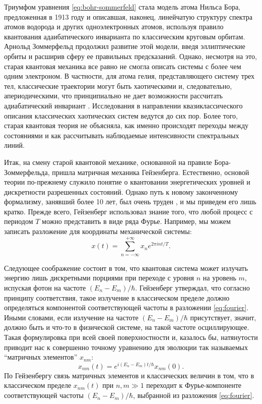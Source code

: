 \documentclass[14pt, a4paper]{extreport}
\numberwithin{equation}{section}
\begin{document}
Триумфом уравнения \eqref{eq:bohr-sommerfeld} стала модель атома Нильса Бора, предложенная в 1913 году и описавшая, наконец, линейчатую структуру спектра атомов водорода и других одноэлектронных атомов, используя правило квантования адаибатического инварианта по классическим круговым орбитам. Арнольд Зоммерфельд продолжил развитие этой модели, введя эллиптические орбиты и расширив сферу ее правильных предсказаний. Однако, несмотря на это, старая квантовая механика все равно не смогла описать системы с более чем одним электроном. В частности, для атома гелия, представляющего систему трех тел, классические траектории могут быть хаотическими и, следовательно, апериодическими, что принципиально не дает возможности рассчитать адиабатический инвариант \cite{wintgen1992semiclassical}. Исследования в направлении квазиклассического описания классических хаотических систем ведутся до сих пор. Более того, старая квантовая теория не объясняла, как именно происходят переходы между состояниями и как рассчитывать наблюдаемые интенсивности спектральных линий.

Итак, на смену старой квантовой механике, основанной на правиле Бора-Зоммерфельда, пришла матричная механика Гейзенберга. Естественно, основой теории по-прежнему служило понятие о квантовании энергетических уровней и дискретности разрешенных состояний. Однако путь к новому законченному формализму, занявший более 10 лет, был очень труден \cite{van2007sources}, и мы приведем его лишь кратко. Прежде всего, Гейзенберг использовал знание того, что любой процесс с периодом $T$ можно представить в виде ряда Фурье. Например, мы можем записать разложение для координаты механической системы:
\begin{equation}
	x(t) = \sum_{n=-\infty}^{+\infty} x_n e^{2\pi i n t/T}.\label{eq:fourier}
\end{equation}

Следующее соображение состоит в том, что квантовая система может излучать энергию лишь дискретными порциями при переходе с уровня $n$ на уровень $m$, испуская фотон на частоте $(E_n - E_m)/\hbar$. Гейзенберг утверждал, что согласно принципу соответствия, такое излучение в классическом пределе должно определяться компонентой соответствующей частоты в разложении \eqref{eq:fourier}. Иными словами, если излучение на частоте $(E_n - E_m)/\hbar$ присутствует, значит, должно быть и что-то в физической системе, на такой частоте осциллирующее. Такая формулировка при всей своей поверхностности и, казалось бы, натянутости приводит нас к совершенно точному уравнению для эволюции так называемых ``матричных элементов'' $x_{nm}$:
\begin{equation}
	x_{nm}(t) = e^{i (E_n - E_m) t / \hbar} x_{nm}(0).\label{eq:heisenberg_evolution}
\end{equation}
По Гейзенбергу связь матричных элементов и классических величин в том, что в классическом пределе $x_{nm}(t)$ при $n, m \gg 1$ переходит к Фурье-компоненте соответствующей частоты $(E_n - E_m)/\hbar$, выбранной из разложения \eqref{eq:fourier}. 
\end{document}
